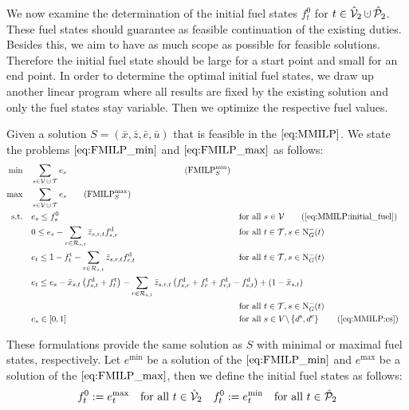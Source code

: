 We now examine the determination of the initial fuel states $f^0_t$ for ${t\in\Vhat_2\cupdot\Phat_2}$. These fuel states should guarantee as feasible continuation of the existing duties. Besides this, we aim to have as much scope as possible for feasible solutions. Therefore the initial fuel state should be large for a start point and small for an end point. In order to determine the optimal initial fuel states, we draw up another linear program where all results are fixed by the existing solution and only the fuel states stay variable. Then we optimize the respective fuel values.

Given a solution ${S=\left(\bar{x},\bar{z},\bar{e},\bar{u}\right)}$ that is feasible in the $\eqref{eq:MMILP}$. We state the problems $\eqref{eq:FMILP_min}$ and $\eqref{eq:FMILP_max}$ as follows:
\begin{align}
	\min \quad & \sum_{s\in\mathcal{V}\cupdot\mathcal{T}} e_s \hphantom{\sum_{s\in\mathcal{V}} \sum_{t\in\Nout(s)\backslash\{d^{\operatorname{e}}\}} x_{s,t}\cv + u_m} \tag{$\operatorname{FMILP}^{\min}_S$} \label{eq:FMILP_min} \\
	\max \quad & \sum_{s\in\mathcal{V}\cupdot\mathcal{T}} e_s \tag{$\operatorname{FMILP}^{\max}_S$} \label{eq:FMILP_max} \\
	\text{s.t.} \quad & e_s \leq f_s^0 & & \text{for all } s\in\mathcal{V} \tag{\ref{eq:MMILP:initial_fuel}} \\
	& 0 \leq e_s - \sum_{r\in\Rst} \bar{z}_{s,r,t}\fd_{s,r} & & \text{for all } t\in\mathcal{T}, s\in\Nin(t) \label{eq:FMILP:min_fuel} \\
	& e_t \leq 1 - \ft_t - \sum_{r\in\Rst} \bar{z}_{s,r,t}\fd_{r,t} & & \text{for all } t\in\mathcal{T}, s\in\Nin(t) \label{eq:FMILP:max_fuel} \\
	& \omit\rlap{$\displaystyle{e_t \leq e_s - \bar{x}_{s,t}\left(f_{s,t}^{\operatorname{d}}+f_t^{\operatorname{t}}\right) - \sum_{r\in\Rst} \bar{z}_{s,r,t}\left(\fd_{s,r}+\ft_r+\fd_{r,t}-\fd_{s,t}\right) + \left(1-\bar{x}_{s,t}\right)}$} \nonumber \\
	& & & \text{for all } t\in\mathcal{T}, s\in\Nin(t) \label{eq:FMILP:fuel_consumption} \\
	& e_s\in[0,1] & & \text{for all } s\in V\backslash\left\{d^{\operatorname{s}},d^{\operatorname{e}}\right\} \tag{\ref{eq:MMILP:es}}
\end{align}

These formulations provide the same solution as $S$ with minimal or maximal fuel states, respectively. Let $e^{\min}$ be a solution of the $\eqref{eq:FMILP_min}$ and $e^{\max}$ be a solution of the $\eqref{eq:FMILP_max}$, then we define the initial fuel states as follows:
\begin{align*}
	f^0_t := e^{\max}_t && \text{for all } t\in\hat{\mathcal{V}}_2 && f^0_t := e^{\min}_t && \text{for all } t\in\hat{\mathcal{P}}_2
\end{align*}

